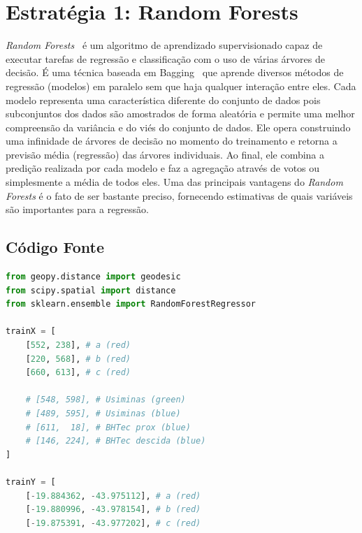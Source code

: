 \documentclass[12pt]{report}
\begin{document}
{\section*{Estratégia 1: Random Forests}
\textit{Random Forests}~\cite{breiman2001random} é um algoritmo de aprendizado supervisionado capaz de executar tarefas de regressão e classificação com o uso de várias árvores de decisão.
É uma técnica baseada em Bagging~\cite{breiman1996bagging} que aprende diversos métodos de regressão (modelos) em paralelo sem que haja qualquer interação entre eles.
Cada modelo representa uma característica diferente do conjunto de dados pois subconjuntos dos dados são amostrados de forma aleatória e permite uma melhor compreensão da variância e do viés do conjunto de dados.
Ele opera construindo uma infinidade de árvores de decisão no momento do treinamento e retorna a previsão média (regressão) das árvores individuais.
Ao final, ele combina a predição realizada por cada modelo e faz a agregação através de votos ou simplesmente a média de todos eles.
Uma das principais vantagens do \textit{Random Forests} é o fato de ser bastante preciso, fornecendo estimativas de quais variáveis são importantes para a regressão.



\subsection*{Código Fonte}
\begin{lstlisting}[language=Python, caption=Código-fonte com Random Forests implementado para a obtenção de valores aproximados para as coordenadas.]
from geopy.distance import geodesic
from scipy.spatial import distance
from sklearn.ensemble import RandomForestRegressor

trainX = [
    [552, 238], # a (red)
    [220, 568], # b (red)
    [660, 613], # c (red)

    # [548, 598], # Usiminas (green)
    # [489, 595], # Usiminas (blue)
    # [611,  18], # BHTec prox (blue)
    # [146, 224], # BHTec descida (blue)
]

trainY = [
    [-19.884362, -43.975112], # a (red)
    [-19.880996, -43.978154], # b (red)
    [-19.875391, -43.977202], # c (red)


\end{lstlisting}}
\end{document}
